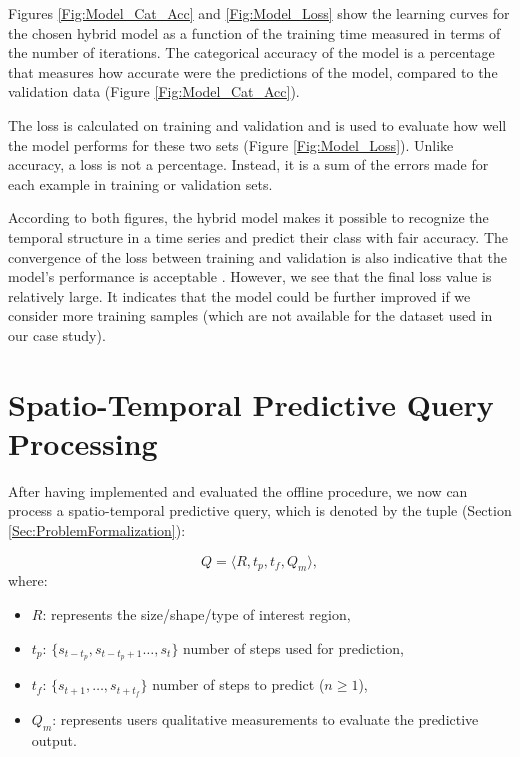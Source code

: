 Figures \ref{Fig:Model_Cat_Acc} and \ref{Fig:Model_Loss} show the learning curves for the chosen hybrid model as a function of the training time measured in terms of the number of iterations. The categorical accuracy of the model is a percentage that measures how accurate were the predictions of the model, compared to the validation data (Figure \ref{Fig:Model_Cat_Acc}).  

The loss is calculated on training and validation and is used to evaluate how well the model performs for these two sets (Figure \ref{Fig:Model_Loss}). Unlike accuracy, a loss is not a percentage. Instead, it is a sum of the errors made for each example in training or validation sets.

According to both figures, the hybrid model makes it possible to recognize the temporal structure in a time series and predict their class with fair accuracy. The convergence of the loss between training and validation is also indicative that the model's performance is acceptable \cite{Charniak2019}. However, we see that the final loss value is relatively large. It indicates that the model could be further improved if we consider more training samples (which are not available for the dataset used in our case study).

\section{Spatio-Temporal Predictive Query Processing}
\label{Sec:SpatioTemporalPredictiveQuery}

After having implemented and evaluated the offline procedure, we now can process a spatio-temporal predictive query, which is denoted by the tuple (Section \ref{Sec:ProblemFormalization}):

\begin{equation*} 
Q = \langle R, t_{p}, t_{f}, Q_{m} \rangle,
\end{equation*}
where:
\begin{itemize}[noitemsep,nolistsep]	
	\item $R$: represents the size/shape/type of interest region,
	\item $t_{p}$: $\{s_{t-t_p}, s_{t-t_{p}+1}\ldots, s_{t}\}$ number of steps used for  prediction,
	\item $t_{f}$: $\{s_{t+1}, \ldots, s_{t+t_f}\}$ number of steps to predict ($n\geq 1$),
	\item $Q_{m}$: represents users qualitative measurements to evaluate the predictive output.
\end{itemize}

